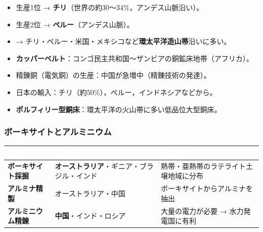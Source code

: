 \documentclass[a4paper,11pt]{article}
\newcommand{\imp}[1]{\textbf{\textcolor{mainred}{#1}}}
\newcommand{\key}[1]{\textbf{\textcolor{mainblue}{#1}}}
\begin{document}
\begin{tcolorbox}[warnbox, title={🔑 銅の統計判定ポイント}]
\begin{itemize}[leftmargin=1em]
  \item 生産1位 → \imp{チリ}（世界の約30〜34\%，アンデス山脈沿い）。
  \item 生産2位 → \imp{ペルー}（アンデス山脈）。
  \item → チリ・ペルー・米国・メキシコなど\imp{環太平洋造山帯}沿いに多い。
  \item \imp{カッパーベルト}：コンゴ民主共和国〜ザンビアの銅鉱床地帯（アフリカ）。
  \item 精錬銅（電気銅）の生産：中国が急増中（精錬技術の発達）。
  \item 日本の輸入：チリ（約50\%），ペルー，インドネシアなどから。
  \item \key{ポルフィリー型銅床}：環太平洋の火山帯に多い低品位大型銅床。
\end{itemize}
\end{tcolorbox}

\vspace{2mm}

\subsubsection{ボーキサイトとアルミニウム}

\begin{center}
\renewcommand{\arraystretch}{1.2}
\begin{tabular}{C{2.2cm}C{3.8cm}C{5.5cm}}
\toprule
{}\textcolor{white}{\textbf{工程}} & \textcolor{white}{\textbf{上位国}} & \textcolor{white}{\textbf{判定ポイント}} \\
\midrule
\key{ボーキサイト採掘} & \imp{オーストラリア}・ギニア・ブラジル・インド & 熱帯・亜熱帯のラテライト土壌地域に分布 \\
\key{アルミナ精製} & オーストラリア・中国 & ボーキサイトからアルミナを抽出 \\
\key{アルミニウム精錬} & \imp{中国}・インド・ロシア & 大量の電力が必要 → 水力発電国に有利 \\
\bottomrule
\end{tabular}
\end{center}
\end{document}

